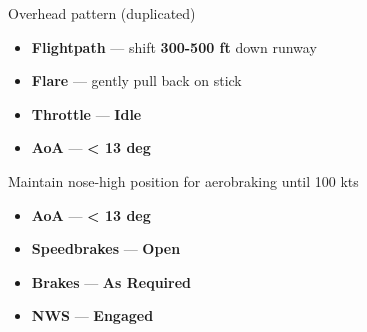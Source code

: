 \begin{checklistenumerate}[resume]
{\begin{tikzpicture}[figstyle]
        \end{tikzpicture}
        \caption{Overhead pattern (duplicated)}
        \label{fig:proc_basic:landing:overhead2}
    }

    \begin{itemize}
        \item \textbf{Flightpath} --- shift \textbf{300-500 ft} down runway
        \item \textbf{Flare} --- gently pull back on stick
        \item \textbf{Throttle} --- \textbf{Idle}
        \item \textbf{AoA} --- \textbf{< 13 deg}
    \end{itemize}

    \blueitem[Touchdown]
    \label{subsec:proc_basic:to_ldg:ldg:touchdown}
    \label{subsec:proc_basic:to_ldg:ldg:roll}
    Maintain nose-high position for aerobraking until 100 kts
    \begin{itemize}
        \item \textbf{AoA} --- \textbf{< 13 deg}
        \item \textbf{Speedbrakes} --- \textbf{Open}
        \item \textbf{Brakes} --- \textbf{As Required}
    \end{itemize}
    \blueitem[Taxi]
    \begin{itemize}
        \item \textbf{NWS} --- \textbf{Engaged}
    \end{itemize}
\end{checklistenumerate}

\clearpage


